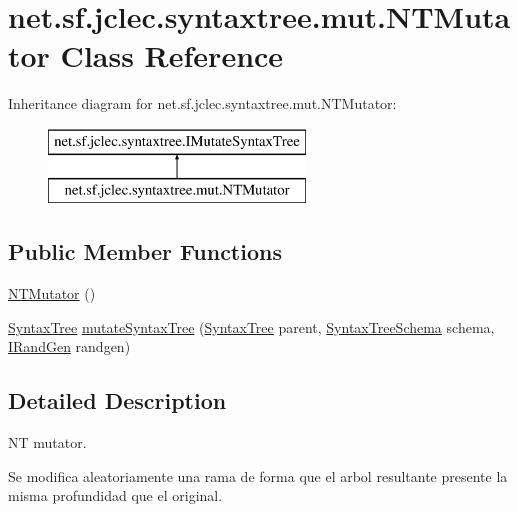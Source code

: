 \hypertarget{classnet_1_1sf_1_1jclec_1_1syntaxtree_1_1mut_1_1_n_t_mutator}{\section{net.\-sf.\-jclec.\-syntaxtree.\-mut.\-N\-T\-Mutator Class Reference}
\label{classnet_1_1sf_1_1jclec_1_1syntaxtree_1_1mut_1_1_n_t_mutator}
}
Inheritance diagram for net.\-sf.\-jclec.\-syntaxtree.\-mut.\-N\-T\-Mutator\-:\begin{figure}[H]
\begin{center}
\leavevmode
\includegraphics[height=2.000000cm]{classnet_1_1sf_1_1jclec_1_1syntaxtree_1_1mut_1_1_n_t_mutator}
\end{center}
\end{figure}
\subsection*{Public Member Functions}
\begin{DoxyCompactItemize}
\item 
\hyperlink{classnet_1_1sf_1_1jclec_1_1syntaxtree_1_1mut_1_1_n_t_mutator_ac9cb2de9bd98bc29fcfd4613ec2fb924}{N\-T\-Mutator} ()
\item 
\hyperlink{classnet_1_1sf_1_1jclec_1_1syntaxtree_1_1_syntax_tree}{Syntax\-Tree} \hyperlink{classnet_1_1sf_1_1jclec_1_1syntaxtree_1_1mut_1_1_n_t_mutator_afd05c791efe11ee78cf29d59c7342e38}{mutate\-Syntax\-Tree} (\hyperlink{classnet_1_1sf_1_1jclec_1_1syntaxtree_1_1_syntax_tree}{Syntax\-Tree} parent, \hyperlink{classnet_1_1sf_1_1jclec_1_1syntaxtree_1_1_syntax_tree_schema}{Syntax\-Tree\-Schema} schema, \hyperlink{interfacenet_1_1sf_1_1jclec_1_1util_1_1random_1_1_i_rand_gen}{I\-Rand\-Gen} randgen)
\end{DoxyCompactItemize}


\subsection{Detailed Description}
N\-T mutator.

Se modifica aleatoriamente una rama de forma que el arbol resultante presente la misma profundidad que el original.

